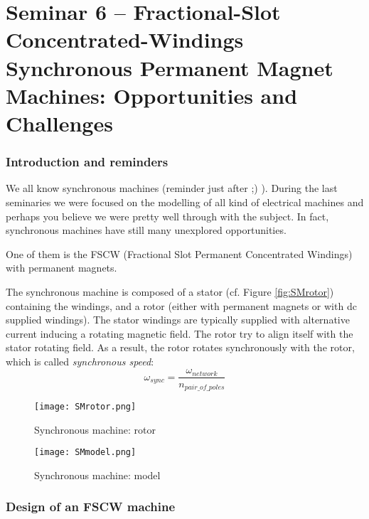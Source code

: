 \part{Seminar 6 -- Fractional-Slot Concentrated-Windings
Synchronous Permanent Magnet Machines:
Opportunities and Challenges}


\section{Introduction and reminders}
We all know synchronous machines (reminder just after ;) ). During the last seminaries we were focused on the modelling of all kind of electrical machines and perhaps you believe we were pretty well through with the subject. In fact, synchronous machines have still many unexplored opportunities.

One of them is the FSCW (Fractional Slot Permanent Concentrated Windings) with permanent magnets.


The synchronous machine is composed of a stator (cf. Figure \ref{fig:SMrotor}) containing the windings, and a rotor (either with permanent magnets or with dc supplied windings). The stator windings are typically supplied with alternative current inducing a rotating magnetic field. The rotor try to align itself with the stator rotating field. As a result, the rotor rotates synchronously with the rotor, which is called \textit{synchronous speed}:
\begin{equation}
    \omega_{sync} = \frac{\omega_{network}}{n_{pair\_of\_poles}}
\end{equation}

\begin{figure}[H]
    \begin{minipage}{0.49 \textwidth}
    \centering
        \texttt{[image: SMrotor.png]}
        \caption{Synchronous machine: rotor}
        \label{fig:SMrotor}
    \end{minipage}
    \begin{minipage}{0.49 \textwidth}
        \centering
        \texttt{[image: SMmodel.png]}
        \caption{Synchronous machine: model}
        \label{fig:SMmodel}
    \end{minipage}
\end{figure}

\section{Design of an FSCW machine}

